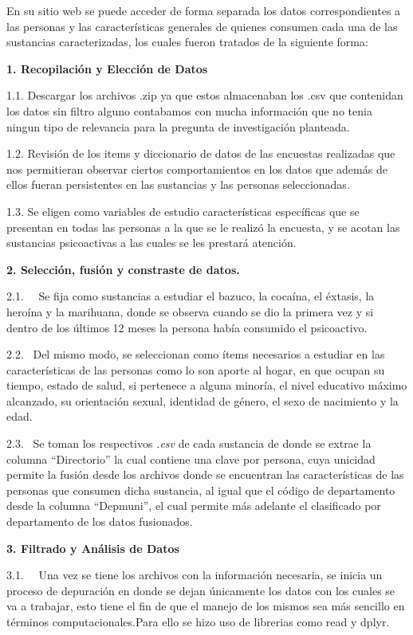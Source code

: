 \documentclass[
]{article}
\begin{document}
En su sitio web se puede acceder de forma separada los datos
correspondientes a las personas y las características generales de
quienes consumen cada una de las sustancias caracterizadas, los cuales
fueron tratados de la siguiente forma:

\textbf{1. Recopilación y Elección de Datos}

1.1. Descargar los archivos .zip ya que estos almacenaban los .csv que
contenidan los datos sin filtro alguno contabamos con mucha información
que no tenia ningun tipo de relevancia para la pregunta de investigación
planteada.

1.2. Revisión de los items y diccionario de datos de las encuestas
realizadas que nos permitieran observar ciertos comportamientos en los
datos que además de ellos fueran persistentes en las sustancias y las
personas seleccionadas.

1.3. Se eligen como variables de estudio características específicas que
se presentan en todas las personas a la que se le realizó la encuesta, y
se acotan las sustancias psicoactivas a las cuales se les prestará
atención.

\textbf{2. Selección, fusión y constraste de datos.}

2.1.~~ Se fija como sustancias a estudiar el bazuco, la cocaína, el
éxtasis, la heroína y la marihuana, donde se observa cuando se dio la
primera vez y si dentro de los últimos 12 meses la persona había
consumido el psicoactivo.

2.2.~ Del mismo modo, se seleccionan como ítems necesarios a estudiar en
las características de las personas como lo son aporte al hogar, en que
ocupan su tiempo, estado de salud, si pertenece a alguna minoría, el
nivel educativo máximo alcanzado, su orientación sexual, identidad de
género, el sexo de nacimiento y la edad.

2.3.~ Se toman los respectivos \emph{.csv} de cada sustancia de donde se
extrae la columna ``Directorio'' la cual contiene una clave por persona,
cuya unicidad permite la fusión desde los archivos donde se encuentran
las características de las personas que consumen dicha sustancia, al
igual que el código de departamento desde la columna ``Depmuni'', el
cual permite más adelante el clasificado por departamento de los datos
fusionados.

\textbf{3. Filtrado y Análisis de Datos}

3.1.~~ Una vez se tiene los archivos con la información necesaria, se
inicia un proceso de depuración en donde se dejan únicamente los datos
con los cuales se va a trabajar, esto tiene el fin de que el manejo de
los mismos sea más sencillo en términos computacionales.Para ello se
hizo uso de librerias como read y dplyr.
\end{document}
